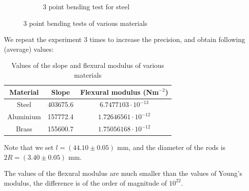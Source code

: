 \documentclass{scrartcl}
\begin{document}
\begin{figure}[!ht]
\begin{subfigure}{0.32\textwidth}
        \caption{3 point bending test for steel}
    \end{subfigure}
    \caption{3 point bending tests of various materials}
    \label{fig:3ptBending}
\end{figure}
\FloatBarrier

We repeat the experiment 3 times to increase the precision, and obtain following (average) values:

\begin{table}[!ht]
    \centering
    \begin{tabular}{c|c|c}
        Material & Slope & Flexural modulus (Nm$^{-2}$)\\ \hline
        Steel & 403675.6 & $6.7477103 \cdot 10^{-13}$ \\
        Aluminium & 157772.4 &  $1.72646561 \cdot 10^{-12}$\\
        Brass & 155600.7 & $1.75056168 \cdot 10^{-12}$
    \end{tabular}
    \caption{Values of the slope and flexural modulus of various materials}
    \label{tab:my_label}
\end{table}

Note that we set $l = (44.10 \pm 0.05)$ mm, and the diameter of the rods is $2R = (3.40 \pm 0.05)$ mm.

The values of the flexural modulus are much smaller than the values of Young's modulus, the difference is of the order of magnitude of $10^{22}$.
\end{document}
